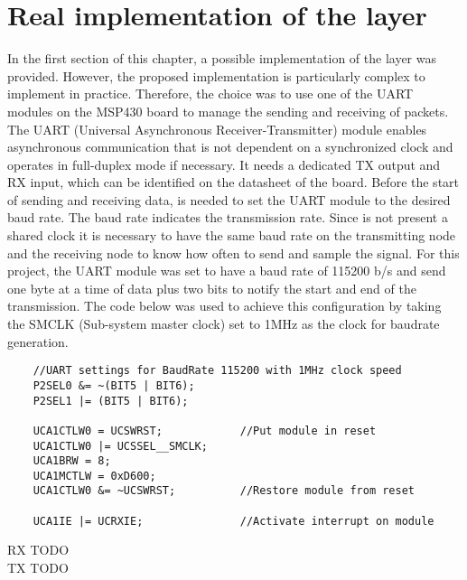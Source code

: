 \section{Real implementation of the layer}
\label{sec:Real implementation of the layer Phy}
In the first section of this chapter, a possible implementation of the layer was provided. However, the proposed implementation is particularly complex to implement in practice.
Therefore, the choice was to use one of the UART modules on the MSP430 board to manage the sending and receiving of packets. 
The UART (Universal Asynchronous Receiver-Transmitter) module enables asynchronous communication that is not dependent on a synchronized clock and operates in full-duplex mode if necessary. It needs a dedicated TX output and RX input, which can be identified on the datasheet of the board.
Before the start of sending and receiving data, is needed to set the UART module to the desired baud rate. The baud rate indicates the transmission rate. Since is not present a shared clock it is necessary to have the same baud rate on the transmitting node and the receiving node to know how often to send and sample the signal.
For this project, the UART module was set to have a baud rate of 115200 b/s and send one byte at a time of data plus two bits to notify the start and end of the transmission.
The code below was used to achieve this configuration by taking the SMCLK (Sub-system master clock) set to 1MHz as the clock for baudrate generation.
\begin{lstlisting}
    //UART settings for BaudRate 115200 with 1MHz clock speed
    P2SEL0 &= ~(BIT5 | BIT6);
    P2SEL1 |= (BIT5 | BIT6);

    UCA1CTLW0 = UCSWRST;            //Put module in reset
    UCA1CTLW0 |= UCSSEL__SMCLK;
    UCA1BRW = 8;
    UCA1MCTLW = 0xD600;
    UCA1CTLW0 &= ~UCSWRST;          //Restore module from reset

    UCA1IE |= UCRXIE;               //Activate interrupt on module
\end{lstlisting}
RX TODO\\
TX TODO\\
  
\newpage




